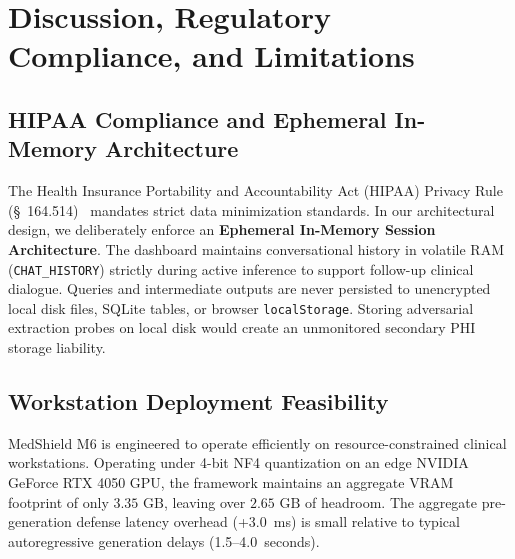 \documentclass[lettersize,journal]{IEEEtran}
\begin{document}
\section{Discussion, Regulatory Compliance, and Limitations}

\subsection{HIPAA Compliance and Ephemeral In-Memory Architecture}
\label{sec:hipaa}
The Health Insurance Portability and Accountability Act (HIPAA) Privacy Rule (\S~164.514)~\cite{hipaa1996} mandates strict data minimization standards. In our architectural design, we deliberately enforce an \textbf{Ephemeral In-Memory Session Architecture}. The dashboard maintains conversational history in volatile RAM (\texttt{CHAT\_HISTORY}) strictly during active inference to support follow-up clinical dialogue. Queries and intermediate outputs are never persisted to unencrypted local disk files, SQLite tables, or browser \texttt{localStorage}. Storing adversarial extraction probes on local disk would create an unmonitored secondary PHI storage liability.

\subsection{Workstation Deployment Feasibility}
MedShield M6 is engineered to operate efficiently on resource-constrained clinical workstations. Operating under 4-bit NF4 quantization on an edge NVIDIA GeForce RTX 4050 GPU, the framework maintains an aggregate VRAM footprint of only $3.35\text{ GB}$, leaving over $2.65\text{ GB}$ of headroom. The aggregate pre-generation defense latency overhead (+3.0~ms) is small relative to typical autoregressive generation delays (1.5--4.0~seconds).
\end{document}
